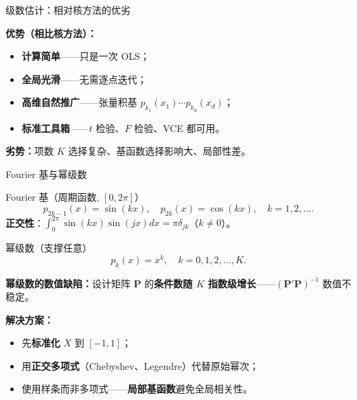 \documentclass[aspectratio=169, 10pt]{beamer}
\begin{document}
\begin{frame}{级数估计：相对核方法的优劣}

  \begin{keybox}
    \textbf{优势（相比核方法）：}
    \begin{itemize}
      \item \textbf{计算简单}——只是一次 OLS；
      \item \textbf{全局光滑}——无需逐点迭代；
      \item \textbf{高维自然推广}——张量积基 $p_{k_1}(x_1)\cdots p_{k_d}(x_d)$；
      \item \textbf{标准工具箱}——$t$ 检验、$F$ 检验、VCE 都可用。
    \end{itemize}

    \textbf{劣势：}项数 $K$ 选择复杂、基函数选择影响大、局部性差。
  \end{keybox}

\end{frame}


\begin{frame}{Fourier 基与幂级数}

  \begin{definitionbox}{{Fourier 基（周期函数, $[0, 2\pi]$）}}
    \[
      p_{2k-1}(x) = \sin(kx),\quad p_{2k}(x) = \cos(kx),\quad k=1,2,\ldots.
    \]
    \textbf{正交性}：$\int_0^{2\pi} \sin(kx)\sin(jx) dx = \pi \delta_{jk}$（$k\neq 0$）。
  \end{definitionbox}

  \begin{definitionbox}{幂级数（支撑任意）}
    \[
      p_k(x) = x^k,\quad k=0,1,2,\ldots,K.
    \]
  \end{definitionbox}

  \begin{highlightbox}
    \textbf{幂级数的数值缺陷：}设计矩阵 $\mathbf{P}$ 的\textbf{条件数随 $K$ 指数级增长}——$(\mathbf{P}'\mathbf{P})^{-1}$ 数值不稳定。
    \vspace{0.2em}

    \textbf{解决方案：}
    \begin{itemize}
      \item 先\textbf{标准化} $X$ 到 $[-1,1]$；
      \item 用\textbf{正交多项式}（Chebyshev、Legendre）代替原始幂次；
      \item 使用样条而非多项式——\textbf{局部基函数}避免全局相关性。
    \end{itemize}
  \end{highlightbox}

\end{frame}
\end{document}
